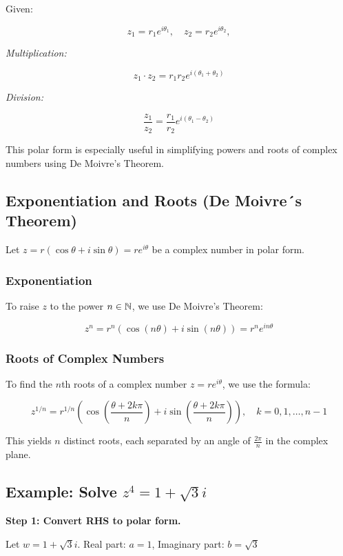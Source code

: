 Given:

\[
	z_1 = r_1 e^{i\theta_1}, \quad z_2 = r_2 e^{i\theta_2},
\]

\emph{Multiplication:}

\[
	z_1 \cdot z_2 = r_1 r_2 e^{i(\theta_1 + \theta_2)}
\]

\emph{Division:}
	      
\[
	\frac{z_1}{z_2} = \frac{r_1}{r_2} e^{i(\theta_1 - \theta_2)}
\]

This polar form is especially useful in simplifying powers and roots of complex numbers using De 
Moivre’s Theorem.

\subsection{Exponentiation and Roots (De Moivre´s Theorem)}

Let \( z = r(\cos \theta + i \sin \theta) = re^{i\theta} \) be a complex number in polar form.

\subsubsection{Exponentiation}

To raise \( z \) to the power \( n \in \mathbb{N} \), we use De Moivre’s Theorem:

\[
	z^n = r^n (\cos(n\theta) + i \sin(n\theta)) = r^n e^{in\theta}
\]

\subsubsection{Roots of Complex Numbers}

To find the \( n \)th roots of a complex number \( z = r e^{i\theta} \), we use the formula:

\[
	z^{1/n} = r^{1/n} \left( \cos\left( \frac{\theta + 2k\pi}{n} \right) + i \sin\left( \frac{\theta + 
	2k\pi}{n} \right) \right), \quad k = 0, 1, \ldots, n-1
\]

This yields \( n \) distinct roots, each separated by an angle of \( \frac{2\pi}{n} \) in 
the complex plane.

\subsection{Example: Solve \texorpdfstring{\( z^4 = 1 + \sqrt{3}i \)}{}}

\textbf{Step 1: Convert RHS to polar form.}

Let \( w = 1 + \sqrt{3}i \). Real part: \( a = 1 \), Imaginary part: \( b = \sqrt{3} \)

